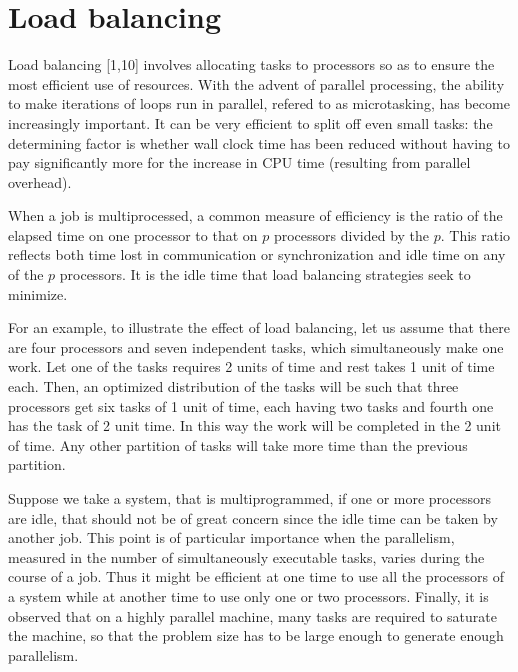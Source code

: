 \section{Load balancing}
Load balancing [1,10] involves allocating tasks to processors so as to ensure the most efficient use of resources. With the advent of parallel processing, the
ability to make iterations of loops run in parallel, refered to as microtasking, has become increasingly important. It can be very efficient to split off even
small tasks: the determining factor is whether wall clock time has been reduced without having to pay significantly more for the increase in CPU time
(resulting from parallel overhead).\par
\hspace{1in} When a job is multiprocessed, a common measure of efficiency is the ratio of the elapsed time on one processor to that on $p$ processors divided
by the $p$. This ratio reflects both time lost in communication or synchronization and idle time on any of the $p$ processors. It is the idle time that load
balancing strategies seek to minimize. \par 
\hspace{1in}For an example, to illustrate the effect of load balancing, let us assume that there are four processors and seven independent tasks, which
simultaneously make one work. Let one of the tasks requires 2 units of time and rest takes 1 unit of time each. Then, an optimized distribution of the tasks
will be such that three processors get six tasks of 1 unit of time, each having two tasks and fourth one has the task of 2 unit time. In this way the work will
be completed in the 2 unit of time. Any other partition of tasks will take more time than the previous partition. \par
\hspace{1in} Suppose we take a system, that is multiprogrammed, if one or more processors are idle, that should not be of great concern since the idle time can
be taken by another job. This point is of particular importance when the parallelism, measured in the number of simultaneously executable tasks, varies during
the course of a job. Thus it might be efficient at one time to use all the processors of a system while at another time to use only one or two processors.
Finally, it is observed that on a highly parallel machine, many tasks are required to saturate the machine, so that the problem size has to be large enough to
generate enough parallelism.
